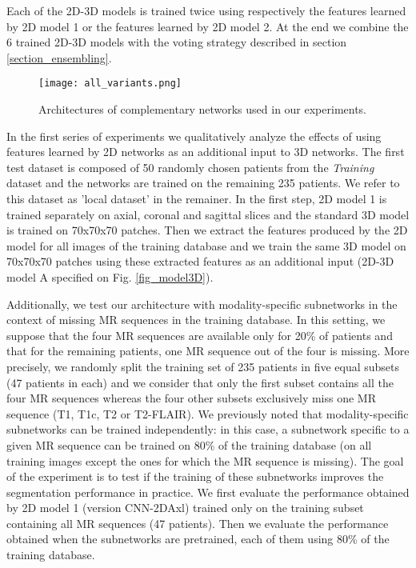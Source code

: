 \documentclass[preprint,12pt]{elsarticle}
\begin{document}
Each of the 2D-3D models is trained twice using respectively the features learned by 2D model 1 or the features learned by 2D model 2. At the end we combine the 6 trained 2D-3D models with the voting strategy described in section \ref{section_ensembling}.

\begin{figure*}[!h]
\centering
\texttt{[image: all\_variants.png]}
\caption{Architectures of complementary networks used in our experiments.}
\label{fig_variants}
\end{figure*}

In the first series of experiments we qualitatively analyze the effects of using features learned by 2D networks as an additional input to 3D networks. The first test dataset is composed of 50 randomly chosen patients from the \textit{Training} dataset and the networks are trained on the remaining 235 patients. We refer to this dataset as 'local dataset' in the remainer. In the first step, 2D model 1 is trained separately on axial, coronal and sagittal slices and the standard 3D model is trained on 70x70x70 patches. Then we extract the features produced by the 2D model for all images of the training database and we train the same 3D model on 70x70x70 patches using these extracted features as an additional input (2D-3D model A specified on Fig. \ref{fig_model3D}).


Additionally, we test our architecture with modality-specific subnetworks in the context of missing MR sequences in the training database. In this setting, we suppose that the four MR sequences are available only for 20\% of patients and that for the remaining patients, one MR sequence out of the four is missing. More precisely, we randomly split the training set of 235 patients in five equal subsets (47 patients in each) and we consider that only the first subset contains all the four MR sequences whereas the four other subsets exclusively miss one MR sequence (T1, T1c, T2 or T2-FLAIR). We previously noted that modality-specific subnetworks can be trained independently: in this case, a subnetwork specific to a given MR sequence can be trained on 80\% of the training database (on all training images except the ones for which the MR sequence is missing). The goal of the experiment is to test if the training of these subnetworks improves the segmentation performance in practice. We first evaluate the performance obtained by 2D model 1 (version CNN-2DAxl) trained only on the training subset containing all MR sequences (47 patients). Then we evaluate the performance obtained when the subnetworks are pretrained, each of them using 80\% of the training database.
\end{document}
